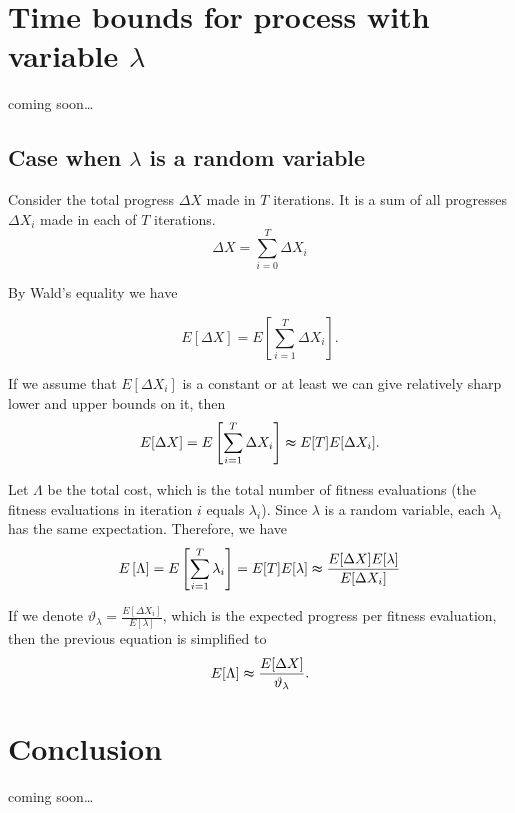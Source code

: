 \documentclass[12pt, a4paper]{article}
\theoremstyle{remark}
\theoremstyle{definition}
\newcommand{\cm}{coming soon\dots}
\begin{document}
\section{Time bounds for process with variable $\lambda$}
\cm
\subsection{Case when $\lambda$ is a random variable}
Consider the total progress $\Delta X$ made in $T$ iterations. It is a sum of all progresses $\Delta X_i$ made in each of $T$ iterations.
\[
    \Delta X = \sum_{i = 0}^{T} \Delta X_i
\]

By Wald's equality we have

\[
    E[\Delta X] = E\left[\sum_{i = 1}^{T} \Delta X_i\right].
\]

If we assume that $E[\Delta X_i]$ is a constant or at least we can give relatively sharp lower and upper bounds on it, then
\[
    E[\Delta X] = E\left[\sum_{i = 1}^{T} \Delta X_i\right] \thickapprox E[T] E[\Delta X_i].
\]

Let $\Lambda$ be the total cost, which is the total number of fitness evaluations (the fitness evaluations in iteration $i$ equals $\lambda_i$). Since $\lambda$ is a random variable, each $\lambda_i$ has the same expectation. Therefore, we have
\[
    E\left[\Lambda\right] = E\left[\sum_{i = 1}^{T} \lambda_i\right] = E[T] E[\lambda] \thickapprox \frac{E[\Delta X] E[\lambda]}{E[\Delta X_i]}
\]

If we denote $\vartheta_\lambda = \frac{E[\Delta X_i]}{E[\lambda]}$, which is the expected progress per fitness evaluation, then the previous equation is simplified to
\[
    E[\Lambda] \thickapprox \frac{E[\Delta X]}{\vartheta_\lambda}.
\]

\section{Conclusion}
\cm




\end{document}
